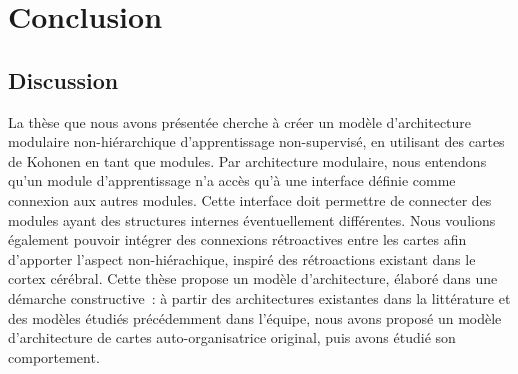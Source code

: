\chapter*{Conclusion}

\section*{Discussion}

La thèse que nous avons présentée cherche à créer un modèle d'architecture modulaire non-hiérarchique d'apprentissage non-supervisé, en utilisant des cartes de Kohonen en tant que modules.
Par architecture modulaire, nous entendons qu'un module d'apprentissage n'a accès qu'à une interface définie comme connexion aux autres modules. Cette interface doit permettre de connecter des modules ayant des structures internes éventuellement différentes.
Nous voulions également pouvoir intégrer des connexions rétroactives entre les cartes afin d'apporter l'aspect non-hiérachique, inspiré des rétroactions existant dans le cortex cérébral.
Cette thèse propose un modèle d'architecture, élaboré dans une démarche constructive~: à partir des architectures existantes dans la littérature et des modèles étudiés précédemment dans l'équipe, nous avons proposé un modèle d'architecture de cartes auto-organisatrice original, puis avons étudié son comportement.

